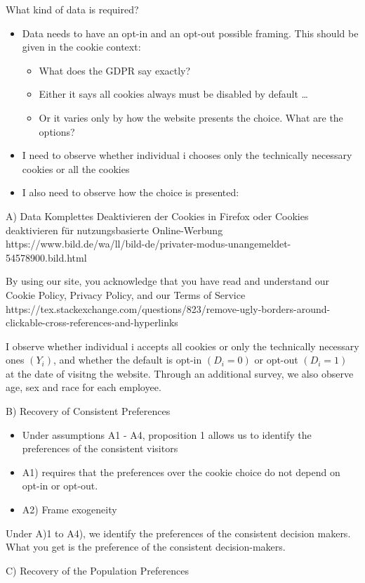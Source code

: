 What kind of data is required?

\begin{itemize}
    \item Data needs to have an opt-in and an opt-out possible framing. This should be given in the cookie context: 
    \begin{itemize}
        \item What does the GDPR say exactly?
        \item Either it says all cookies always must be disabled by default \dots 
        \item Or it varies only by how the website presents the choice. What are the options? 
    \end{itemize}
    \item I need to observe whether individual i chooses only the technically necessary cookies or all the cookies
    \item I also need to observe how the choice is presented: 
\end{itemize}

A) Data
Komplettes Deaktivieren der Cookies in Firefox oder Cookies deaktivieren für nutzungsbasierte Online-Werbung
https://www.bild.de/wa/ll/bild-de/privater-modus-unangemeldet-54578900.bild.html

By using our site, you acknowledge that you have read and understand our Cookie Policy, Privacy Policy, and our Terms of Service
https://tex.stackexchange.com/questions/823/remove-ugly-borders-around-clickable-cross-references-and-hyperlinks

I observe whether individual i accepts all cookies or only the technically necessary ones $(Y_{i})$, and whether the default is opt-in $ (D_{i} = 0) $ or opt-out $ (D_{i} = 1) $ at the date of visitng the website. 
Through an additional survey, we also observe age, sex and race for each employee.

B) Recovery of Consistent Preferences

\begin{itemize}
    \item Under assumptions A1 - A4, proposition 1 allows us to identify the preferences of the consistent visitors
    \item A1) requires that the preferences over the cookie choice do not depend on opt-in or opt-out.
    \item A2) Frame exogeneity
\end{itemize}

Under A)1 to A4), we identify the preferences of the consistent decision makers.
What you get is the preference of the consistent decision-makers.

C) Recovery of the Population Preferences


